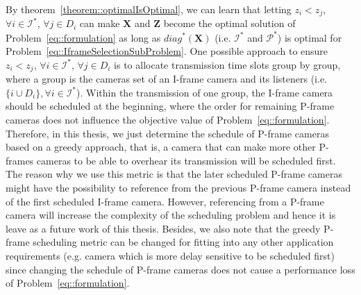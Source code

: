 By theorem~\ref{theorem::optimalIsOptimal}, we can learn that letting ${z_i < z_j}$, ${\forall i \in \mathcal{I}^*}$, ${\forall j \in D_i}$ can make $\mathbf{X}$ and $\mathbf{Z}$ become the optimal solution of Problem~\eqref{eq::formulation} as long as $diag^*(\mathbf{X})$ (i.e. $\mathcal{I}^*$ and $\mathcal{P}^*$) is optimal for Problem~\eqref{eq::IframeSelectionSubProblem}.
One possible approach to ensure ${z_i < z_j}$, ${\forall i \in \mathcal{I}^*}$, ${\forall j \in D_i}$ is to allocate transmission time slots group by group, where a group is the cameras set of an I-frame camera and its listeners (i.e. $\{i \cup D_i\},{\forall i \in \mathcal{I}^*}$).
Within the transmission of one group, the I-frame camera should be scheduled at the beginning, where the order for remaining P-frame cameras does not influence the objective value of Problem~\eqref{eq::formulation}.
Therefore, in this thesis, we just determine the schedule of P-frame cameras based on a greedy approach, that is, a camera that can make more other P-frames cameras to be able to overhear its transmission will be scheduled first.
The reason why we use this metric is that the later scheduled P-frame cameras might have the possibility to reference from the previous P-frame camera instead of the first scheduled I-frame camera.
However, referencing from a P-frame camera will increase the complexity of the scheduling problem and hence it is leave as a future work of this thesis.
Besides, we also note that the greedy P-frame scheduling metric can be changed for fitting into any other application requirements (e.g. camera which is more delay sensitive to be scheduled first) since changing the schedule of P-frame cameras does not cause a performance loss of Problem~\eqref{eq::formulation}.

